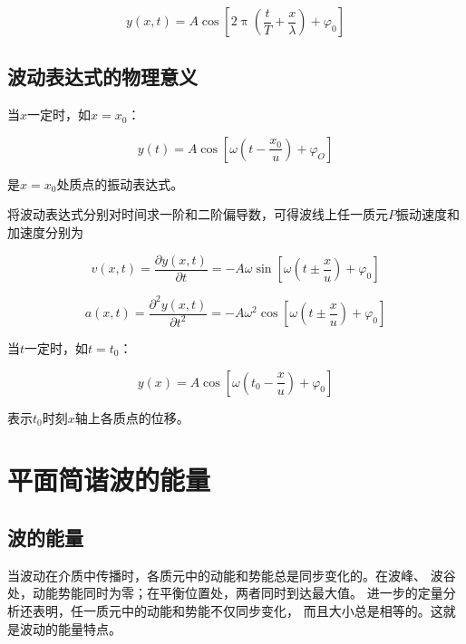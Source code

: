 \documentclass[
	12pt, %
	a4paper, %
]{myLegrandOrangeBook}
\begin{document}
    \begin{equation}
        y(x, t)=A \cos \left[2 \uppi\left(\frac{t}{T}+\frac{x}{\lambda}\right)+\varphi_0\right]
    \end{equation}

\subsection{波动表达式的物理意义}

    当\(x \)一定时，如\(x = x_0\)：

    \begin{equation}
        y(t)=A \cos \left[\omega\left(t-\frac{x_0}{u}\right)+\varphi_O\right]
    \end{equation}

    是\(x = x_0\)处质点的振动表达式。

    将波动表达式分别对时间求一阶和二阶偏导数，可得波线上任一质元\(P\)振动速度和加速度分别为

    \begin{equation}
        v(x, t)=\frac{\partial y(x, t)}{\partial t}=-A \omega \sin \left[\omega\left(t \pm \frac{x}{u}\right)+\varphi_0\right]
    \end{equation}
    
    \begin{equation}
        a(x, t)=\frac{\partial^2 y(x, t)}{\partial t^2}=-A \omega^2 \cos \left[\omega\left(t \pm \frac{x}{u}\right)+\varphi_0\right]
    \end{equation}
    
    \vspace{1em}

    当\(t \)一定时，如\(t = t_0\)：

    \begin{equation}
        y(x)=A \cos \left[\omega\left(t_0-\frac{x}{u}\right)+\varphi_0\right]
    \end{equation}

    表示\(t_0\)时刻\(x\)轴上各质点的位移。

\section{平面简谐波的能量}

\subsection{波的能量}

    当波动在介质中传播时，各质元中的动能和势能总是同步变化的。在波峰、
    波谷处，动能势能同时为零；在平衡位置处，两者同时到达最大值。
    进一步的定量分析还表明，任一质元中的动能和势能不仅同步变化，
    而且大小总是相等的。这就是波动的能量特点。
\end{document}
